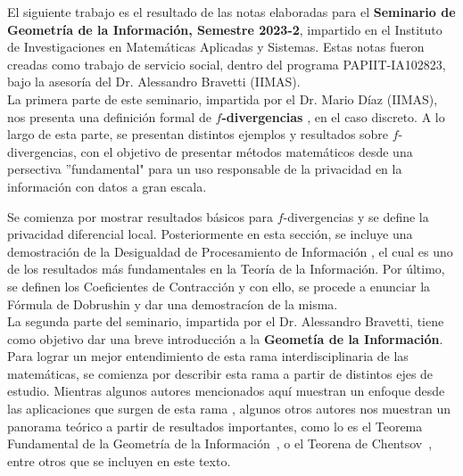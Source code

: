 El siguiente trabajo es el resultado de las notas elaboradas para el \textbf{Seminario de Geometr\'ia de la Informaci\'on, Semestre 2023-2}, impartido en el Instituto de Investigaciones en Matem\'aticas Aplicadas y Sistemas. Estas notas fueron creadas como trabajo de servicio social, dentro del programa PAPIIT-IA102823, bajo la asesor\'ia del Dr. Alessandro Bravetti (IIMAS).  
\\

La primera parte de este seminario, impartida por el Dr. Mario D\'iaz (IIMAS), nos presenta una definici\'on formal de \textbf{$f$-divergencias} \cite{1571417125811646464}, en el caso discreto. A lo largo de esta parte, se presentan distintos ejemplos y resultados sobre $f$-divergencias, con el objetivo de presentar m\'etodos matem\'aticos desde una persectiva ”fundamental" para un uso responsable de la privacidad en la informaci\'on con datos a gran escala.

Se comienza por mostrar resultados b\'asicos para $f$-divergencias y se define la privacidad diferencial local. Posteriormente en esta secci\'on, se incluye una demostraci\'on de la Desigualdad de Procesamiento de Informaci\'on \cite{polyanskiy2014lecture}, el cual es uno de los resultados m\'as fundamentales en la Teor\'ia de la Informaci\'on. Por \'ultimo, se definen los Coeficientes de Contracci\'on y con ello, se procede a enunciar la F\'ormula de Dobrushin y dar una demostrac\'ion de la misma. 
\\

La segunda parte del seminario, impartida por el Dr. Alessandro Bravetti, tiene como objetivo dar una breve introducci\'on a la \textbf{Geomet\'ia de la Informaci\'on}. Para lograr un mejor entendimiento de esta rama interdisciplinaria de las matem\'aticas, se comienza por describir esta rama a partir de distintos ejes de estudio. Mientras algunos autores mencionados aqu\'i muestran un enfoque desde las aplicaciones que surgen de esta rama \cite{amari2016information,nielsen2020elementary}, algunos otros autores nos muestran un panorama te\'orico \cite{calin2014geometric,ay2017information} a partir de resultados importantes, como lo es el Teorema Fundamental de la Geometr\'ia de la Informaci\'on~\cite{nielsen2020elementary}, 
o el Teorena de Chentsov~\cite{chentsov1982statiscal}, entre otros que se incluyen en este texto.   

